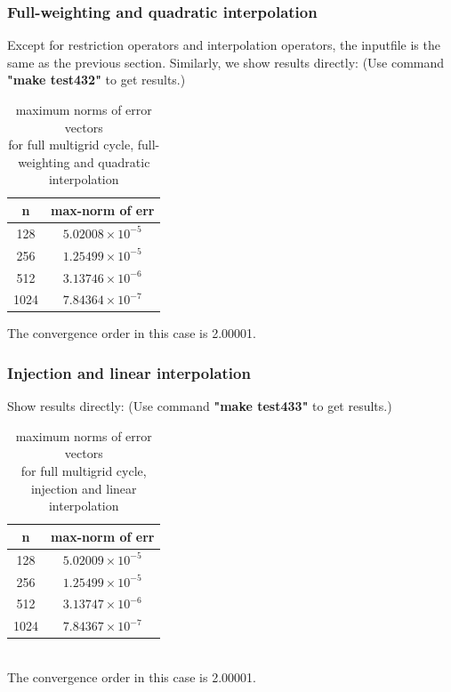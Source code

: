 \documentclass[a4paper,twocolumn]{article}
\theoremstyle{definition}
\begin{document}
\subsubsection{Full-weighting and quadratic interpolation}
Except for restriction operators and interpolation operators, the inputfile is the same as the previous section. Similarly, we show results directly: (Use command \textbf{"make test432"} to get results.)
\newpage
\begin{table}[!htp]
	\centering
	\begin{tabular}{|c|c|}
		\hline	
		n  & max-norm of err \\
		\hline		
		128 & $5.02008\times 10^{-5}$ \\
		\hline		
		256 & $1.25499\times 10^{-5}$ \\
		\hline		
		512 & $3.13746\times 10^{-6}$ \\
		\hline		
		1024 & $7.84364\times 10^{-7}$ \\
		\hline
	\end{tabular}
	\caption{maximum norms of error vectors \\for full multigrid cycle, full-weighting and quadratic interpolation}
\end{table}
\balance
\noindent The convergence order in this case is 2.00001.
\subsubsection{Injection and linear interpolation}
Show results directly: (Use command \textbf{"make test433"} to get results.)
\begin{table}[!htp]
	\centering
	\begin{tabular}{|c|c|}
		\hline	
		n  & max-norm of err \\
		\hline		
		128 & $5.02009\times 10^{-5}$ \\
		\hline		
		256 & $1.25499\times 10^{-5}$ \\
		\hline		
		512 & $3.13747\times 10^{-6}$ \\
		\hline		
		1024 & $7.84367\times 10^{-7}$ \\
		\hline
	\end{tabular}
	\caption{maximum norms of error vectors \\for full multigrid cycle, injection and linear interpolation}
\end{table}\\
The convergence order in this case is 2.00001.
\end{document}
